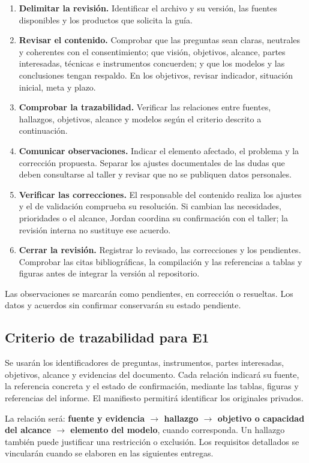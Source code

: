 \begin{enumerate}
\item \textbf{Delimitar la revisión.} Identificar el archivo y su versión, las fuentes disponibles y los productos que solicita la guía.
\item \textbf{Revisar el contenido.} Comprobar que las preguntas sean claras, neutrales y coherentes con el consentimiento; que visión, objetivos, alcance, partes interesadas, técnicas e instrumentos concuerden; y que los modelos y las conclusiones tengan respaldo. En los objetivos, revisar indicador, situación inicial, meta y plazo.
\item \textbf{Comprobar la trazabilidad.} Verificar las relaciones entre fuentes, hallazgos, objetivos, alcance y modelos según el criterio descrito a continuación.
\item \textbf{Comunicar observaciones.} Indicar el elemento afectado, el problema y la corrección propuesta. Separar los ajustes documentales de las dudas que deben consultarse al taller y revisar que no se publiquen datos personales.
\item \textbf{Verificar las correcciones.} El responsable del contenido realiza los ajustes y el de validación comprueba su resolución. Si cambian las necesidades, prioridades o el alcance, Jordan coordina su confirmación con el taller; la revisión interna no sustituye ese acuerdo.
\item \textbf{Cerrar la revisión.} Registrar lo revisado, las correcciones y los pendientes. Comprobar las citas bibliográficas, la compilación y las referencias a tablas y figuras antes de integrar la versión al repositorio.
\end{enumerate}

Las observaciones se marcarán como pendientes, en corrección o resueltas. Los datos y acuerdos sin confirmar conservarán su estado pendiente.

\subsection{Criterio de trazabilidad para E1}

Se usarán los identificadores de preguntas, instrumentos, partes interesadas, objetivos, alcance y evidencias del documento. Cada relación indicará su fuente, la referencia concreta y el estado de confirmación, mediante las tablas, figuras y referencias del informe. El manifiesto permitirá identificar los originales privados.

La relación será: \textbf{fuente y evidencia $\rightarrow$ hallazgo $\rightarrow$ objetivo o capacidad del alcance $\rightarrow$ elemento del modelo}, cuando corresponda. Un hallazgo también puede justificar una restricción o exclusión. Los requisitos detallados se vincularán cuando se elaboren en las siguientes entregas.

